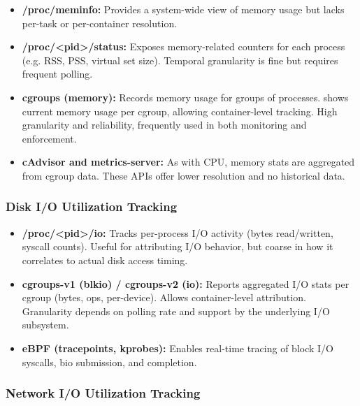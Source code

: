\begin{itemize}
    \item \textbf{/proc/meminfo:} Provides a system-wide view of memory usage but lacks per-task or per-container resolution.
    \item \textbf{/proc/\textless pid\textgreater/status:} Exposes memory-related counters for each process (e.g. RSS, PSS, virtual set size). Temporal granularity is fine but requires frequent polling.
    \item \textbf{cgroups (memory):} Records memory usage for groups of processes.  shows current memory usage per cgroup, allowing container-level tracking. High granularity and reliability, frequently used in both monitoring and enforcement.
    \item \textbf{cAdvisor and metrics-server:} As with CPU, memory stats are aggregated from cgroup data. These APIs offer lower resolution and no historical data.
\end{itemize}

\subsubsection{Disk I/O Utilization Tracking}

\begin{itemize}
    \item \textbf{/proc/\textless pid\textgreater/io:} Tracks per-process I/O activity (bytes read/written, syscall counts). Useful for attributing I/O behavior, but coarse in how it correlates to actual disk access timing.
    \item \textbf{cgroups-v1 (blkio) / cgroups-v2 (io):} Reports aggregated I/O stats per cgroup (bytes, ops, per-device). Allows container-level attribution. Granularity depends on polling rate and support by the underlying I/O subsystem.
    \item \textbf{eBPF (tracepoints, kprobes):} Enables real-time tracing of block I/O syscalls, bio submission, and completion.
\end{itemize}

\subsubsection{Network I/O Utilization Tracking}

